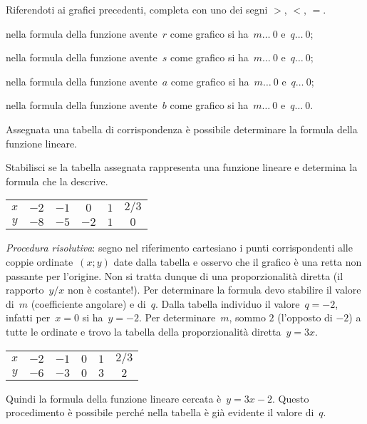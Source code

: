 \begin{exrig}
 \begin{esempio}
Riferendoti ai grafici precedenti, completa con uno dei segni $>$, $<$, $=$.
\begin{itemize*}
\item nella formula della funzione avente~$r$ come grafico si ha~$m \ldots~0$ e~$q \ldots~0$;
\item nella formula della funzione avente~$s$ come grafico si ha~$m \ldots~0$ e~$q \ldots~0$;
\item nella formula della funzione avente~$a$ come grafico si ha~$m \ldots~0$ e~$q \ldots~0$;
\item nella formula della funzione avente~$b$ come grafico si ha~$m \ldots~0$ e~$q \ldots~0$.
\end{itemize*}
 \end{esempio}
\end{exrig}
Assegnata una tabella di corrispondenza è possibile determinare la formula della funzione lineare.
\begin{exrig}
 \begin{esempio}
Stabilisci se la tabella assegnata rappresenta una funzione lineare e determina la formula che la descrive.
\begin{center}
 \begin{tabular}{cccccc}
 \toprule
 $x$ & $-2$ & $-1$ & $0$ & $1$ & $2/3$\\
 $y$ & $-8$ & $-5$ & $-2$ & $1$ & $0$\\
 \bottomrule
 \end{tabular}
\end{center}

\emph{Procedura risolutiva}: segno nel riferimento cartesiano i punti corrispondenti alle coppie ordinate~$(x;y)$
date dalla tabella e osservo che il grafico è una retta non passante per l'origine. Non si tratta dunque di una
proporzionalità diretta (il rapporto~$y/x$ non è costante!). Per determinare la formula devo stabilire
il valore di~$m$ (coefficiente angolare) e di~$q$.
Dalla tabella individuo il valore~$q=-2$, infatti per~$x=0$ si ha~$y=-2$. Per determinare~$m$, sommo
$2$ (l'opposto di $-2$) a tutte le ordinate e trovo la tabella della proporzionalità diretta~$y=3x$.
\begin{center}
 \begin{tabular}{cccccc}
 \toprule
 $x$ & $-2$ & $-1$ & $0$ & $1$ & $2/3$\\
 $y$ & $-6$ & $-3$ & $0$ & $3$ & $2$\\
 \bottomrule
 \end{tabular}
\end{center}
Quindi la formula della funzione lineare cercata è~$y=3x-2$.
Questo procedimento è possibile perché nella tabella è già evidente il valore di~$q$.
 \end{esempio}
\end{exrig}

